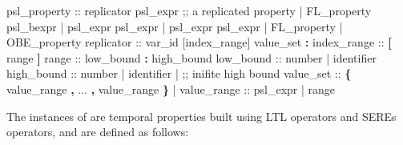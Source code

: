 %
\begin{Grammar}
psl_property ::
   replicator psl_expr ;; a replicated property
 | FL_property  psl_bexpr
 | psl_expr \operator{<->} psl_expr
 | psl_expr \operator{->} psl_expr
 | FL_property
 | OBE_property
replicator ::
    var_id [index_range]  value_set \textbf{:}
index_range ::
   \textbf{[} range \textbf{]}
range ::
   low_bound \textbf{:} high_bound
low_bound ::
   number
 | identifier
high_bound ::
   number
 | identifier
 |              ;; inifite high bound
value_set ::
   \textbf{\{} value_range \textbf{,} ... \textbf{,} value_range \textbf{\}}
 | 
value_range ::
   psl_expr
 | range
\end{Grammar}
%
The instances of  are temporal properties built
using LTL operators and SEREs operators, and are defined as follows:
%

